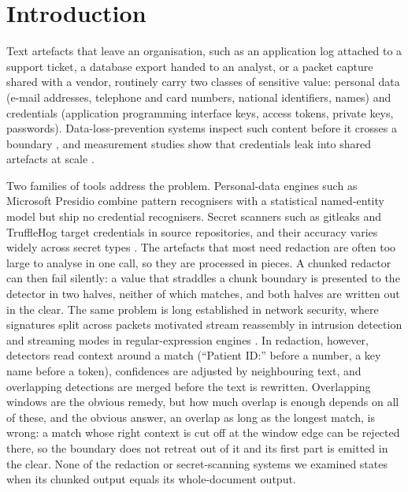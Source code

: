 \section{Introduction}\label{sec:intro}

Text artefacts that leave an organisation, such as an application log attached to a support ticket, a database export handed to an analyst, or a packet capture shared with a vendor, routinely carry two classes of sensitive value: personal data (e-mail addresses, telephone and card numbers, national identifiers, names) and credentials (application programming interface keys, access tokens, private keys, passwords). Data-loss-prevention systems inspect such content before it crosses a boundary \cite{alneyadi2016dlp,manmadhan2014behavioural,manmadhan2014email}, and measurement studies show that credentials leak into shared artefacts at scale \cite{meli2019git,krause2023pushed}.

Two families of tools address the problem. Personal-data engines such as Microsoft Presidio \cite{presidio} combine pattern recognisers with a statistical named-entity model but ship no credential recognisers. Secret scanners such as gitleaks \cite{gitleaks} and TruffleHog \cite{trufflehog} target credentials in source repositories, and their accuracy varies widely across secret types \cite{basak2023comparative}. The artefacts that most need redaction are often too large to analyse in one call, so they are processed in pieces. A chunked redactor can then fail silently: a value that straddles a chunk boundary is presented to the detector in two halves, neither of which matches, and both halves are written out in the clear. The same problem is long established in network security, where signatures split across packets motivated stream reassembly in intrusion detection \cite{ptacek1998insertion} and streaming modes in regular-expression engines \cite{wang2019hyperscan,intel2019hyperscanintro}. In redaction, however, detectors read context around a match (``Patient ID:'' before a number, a key name before a token), confidences are adjusted by neighbouring text, and overlapping detections are merged before the text is rewritten. Overlapping windows are the obvious remedy, but how much overlap is enough depends on all of these, and the obvious answer, an overlap as long as the longest match, is wrong: a match whose right context is cut off at the window edge can be rejected there, so the boundary does not retreat out of it and its first part is emitted in the clear. None of the redaction or secret-scanning systems we examined states when its chunked output equals its whole-document output.

